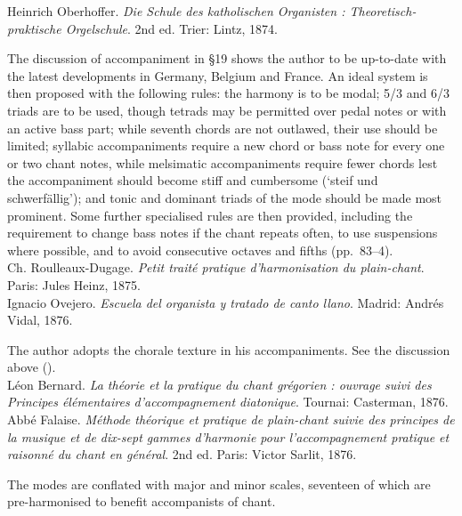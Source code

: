     \parindent=0pt
    \hangindent=0pt
  Heinrich Oberhoffer. \emph{Die Schule des katholischen Organisten : Theoretisch-praktische Orgelschule}. 2nd ed. Trier:  Lintz, 1874.

     \parindent=20pt
     \hangindent=20pt
     The discussion of accompaniment in \S{}19 shows the author to be up-to-date with the latest developments in Germany, Belgium and France. An ideal system is then proposed with the following rules: the harmony is to be modal; 5/3 and 6/3 triads are to be used, though tetrads may be permitted over pedal notes or with an active bass part; while seventh chords are not outlawed, their use should be limited; syllabic accompaniments require a new chord or bass note for every one or two chant notes, while melsimatic accompaniments require fewer chords lest the accompaniment should become stiff and cumbersome (`steif und schwerfällig'); and tonic and dominant triads of the mode should be made most prominent. Some further specialised rules are then provided, including the requirement to change bass notes if the chant repeats often, to use suspensions where possible, and to avoid consecutive octaves and fifths (pp.~83--4).\\

    \parindent=0pt
    \hangindent=0pt
  \covid{}Ch. Roulleaux-Dugage. \emph{Petit traité pratique d'harmonisation du plain-chant}. Paris:  Jules Heinz, 1875. \\

    \parindent=0pt
    \hangindent=0pt
  Ignacio Ovejero. \emph{ Escuela del organista y tratado de canto llano}. Madrid:  Andrés Vidal, 1876.

     \parindent=20pt
     \hangindent=20pt
     The author adopts the chorale texture in his accompaniments. See the discussion above ().\\

    \parindent=0pt
    \hangindent=0pt
  \covid{}Léon Bernard. \emph{La théorie et la pratique du chant grégorien : ouvrage suivi des Principes élémentaires d'accompagnement diatonique}. Tournai:  Casterman, 1876. \\

    \parindent=0pt
    \hangindent=0pt
  Abbé Falaise. \emph{Méthode théorique et pratique de plain-chant suivie des principes de la musique et de dix-sept gammes d'harmonie pour l'accompagnement pratique et raisonné du chant en général}. 2nd ed. Paris:  Victor Sarlit, 1876.

     \parindent=20pt
     \hangindent=20pt
     The modes are conflated with major and minor scales, seventeen of which are pre-harmonised to benefit accompanists of chant.\\

